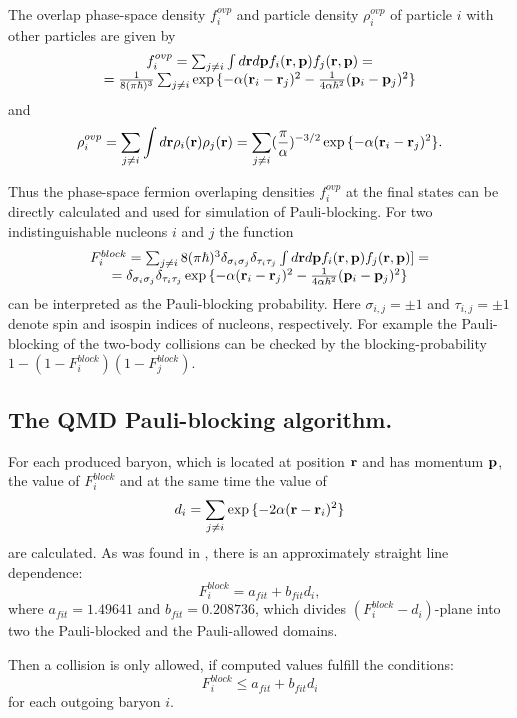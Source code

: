The overlap phase-space density $f^{ovp}_i$ and particle density
$\rho^{ovp}_i$ of particle $i$ with other particles are given by
\begin{equation}
\begin{array}{c}
\label{PBS11} f^{ovp}_i = \sum_{j\neq i}
\int d{\bf r}d{\bf p} f_i({\bf r},{\bf p})f_j({\bf r},{\bf p})= \\
= \frac{1}{8(\pi \hbar)^{3}}\sum_{j\neq i}
\exp{\{-\alpha ({\bf r}_i-{\bf r}_j)^2-\frac{1}{4\alpha \hbar^2}({\bf p}_i-{\bf p}_j)^2\}}
\end{array}
\end{equation}
and
\begin{equation}
\label{PBS12} \rho^{ovp}_i = \sum_{j\neq i}
\int d{\bf r} \rho_i({\bf r})\rho_j({\bf r})
= \sum_{j\neq i}(\frac{\pi}{\alpha})^{-3/2}
\exp{\{-\alpha ({\bf r}_i-{\bf r}_j)^2\}}.
\end{equation}

Thus the phase-space fermion overlaping densities $f^{ovp}_i$ at the
final states can be directly calculated and used for simulation of
Pauli-blocking.
For two indistinguishable nucleons $i$ and $j$ the  function
\begin{equation}
\begin{array}{c}
\label{PBS13}
F^{block}_{i}=\sum_{j\neq i} 8(\pi \hbar)^3 \delta_{\sigma_i\sigma_j}
\delta_{\tau_i\tau_j}
\int d{\bf r}d{\bf p} f_i({\bf r},{\bf p})f_j({\bf r},{\bf p})]= \\
=\delta_{\sigma_i\sigma_j}\delta_{\tau_i\tau_j}
\exp{\{-\alpha ({\bf r}_i-{\bf r}_j)^2-\frac{1}{4\alpha \hbar^2}
({\bf p}_i-{\bf p}_j)^2\}}
\end{array}
\end{equation}
can be interpreted as the Pauli-blocking probability.
  Here
$\sigma_{i,j}=\pm 1$ and $\tau_{i,j}=\pm 1$ denote spin and isospin
indices of nucleons, respectively.
For example the Pauli-blocking of the two-body collisions can be checked by the
blocking-probability $1- (1-F^{block}_i)(1-F^{block}_j)$.

\subsection{The QMD Pauli-blocking algorithm.}
\hspace{1.0em}For each produced baryon, which is located at position
${\bf r}$ and has momentum ${\bf p}$, the value of
$F^{block}_i$
and at the same time the value of 
\begin{equation}
\label{PBS14}
d_i=\sum_{j\neq i}\exp{\{-2\alpha ({\bf r}-{\bf r}_i)^2\}}
\end{equation}
are calculated.  As was found in \cite{Konopka96}, there is an
approximately straight line dependence:
\begin{equation}
\label{PBS15}
F^{block}_i = a_{fit} + b_{fit}d_i,
\end{equation}
where $a_{fit}=1.49641$ and $b_{fit}=0.208736$, which divides
$(F^{block}_i-d_i)$-plane into two the Pauli-blocked and the
Pauli-allowed domains.

Then a collision is only allowed, if computed values fulfill the
conditions:
\begin{equation}
\label{PBS16} F^{block}_i \leq a_{fit} + b_{fit}d_i
\end{equation}  
for each outgoing baryon $i$.
